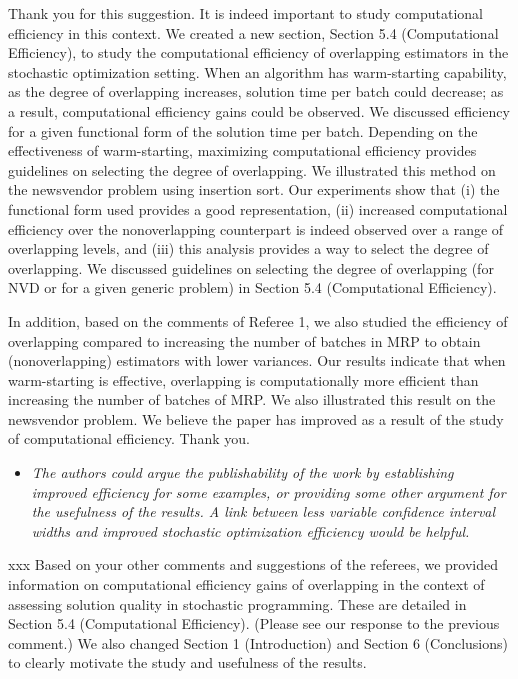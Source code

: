 \documentclass[11pt,notitlepage,onecolumn]{article}
\newcommand{\noi}{\noindent}
\begin{document}
\noi 
Thank you for this suggestion. 
It is indeed important to study computational efficiency in this context. 
We created a new section, Section 5.4 (Computational Efficiency), to study the computational efficiency of overlapping estimators in the stochastic optimization setting. 
When an algorithm has warm-starting capability, as the degree of overlapping increases,  solution time per batch could decrease; as a result, computational efficiency gains could be observed.  
We discussed efficiency for a given functional form of the solution time per batch. 
Depending on the effectiveness of warm-starting, maximizing computational efficiency provides guidelines on selecting the degree of overlapping. 
We illustrated this method on the newsvendor problem using insertion sort. 
Our experiments show that (i) the functional form used provides a good representation, (ii) increased computational efficiency over the nonoverlapping counterpart is indeed observed over a range of overlapping levels, and (iii) this analysis provides a way to select the degree of overlapping. 
We discussed guidelines on selecting the degree of overlapping (for NVD or for a given generic problem) in Section 5.4 (Computational Efficiency). 
\medskip 

In addition, based on the comments of Referee 1, we also studied the efficiency of overlapping compared to increasing the number of batches in MRP to obtain (nonoverlapping) estimators with lower variances. 
Our results indicate that when warm-starting is effective, overlapping is computationally more efficient than increasing the number of batches of MRP.
We also illustrated this result on the newsvendor problem. 
We believe the paper has improved as a result of the study of computational efficiency. 
Thank you. 
\medskip 


\begin{itemize}
\item[] \textit{The authors could argue the publishability of the work by establishing improved efficiency for some examples, or providing some other argument for the usefulness of the results.  
A link between less variable confidence interval widths and improved stochastic optimization efficiency would be helpful.}
\end{itemize}

\noi xxx 
Based on your other comments and suggestions of the referees, we provided information on computational efficiency gains of overlapping in the context of assessing solution quality in stochastic programming. 
These are detailed in Section 5.4 (Computational Efficiency). 
(Please see our response to the previous comment.)
We also changed Section 1 (Introduction) and Section 6 (Conclusions) to clearly motivate the study and usefulness of the results. 
\end{document}
